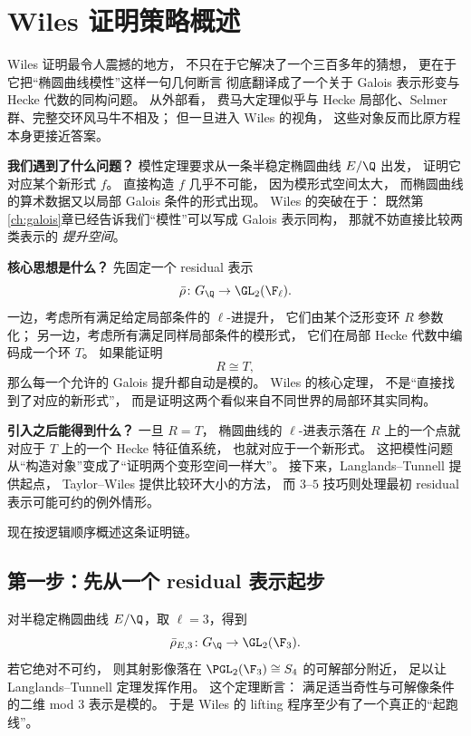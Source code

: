 \section{Wiles 证明策略概述}
\label{sec:ch10-wiles-strategy}

\providecommand{\rhobar}{\bar{\rho}}
\providecommand{\Sel}{\operatorname{Sel}}

Wiles 证明最令人震撼的地方，
不只在于它解决了一个三百多年的猜想，
更在于它把“椭圆曲线模性”这样一句几何断言
彻底翻译成了一个关于 Galois 表示形变与 Hecke 代数的同构问题。
从外部看，
费马大定理似乎与 Hecke 局部化、Selmer 群、完整交环风马牛不相及；
但一旦进入 Wiles 的视角，
这些对象反而比原方程本身更接近答案。

\textbf{我们遇到了什么问题？}
模性定理要求从一条半稳定椭圆曲线 $E/\Q$ 出发，
证明它对应某个新形式 $f$。
直接构造 $f$ 几乎不可能，
因为模形式空间太大，
而椭圆曲线的算术数据又以局部 Galois 条件的形式出现。
Wiles 的突破在于：
既然第\ref{ch:galois}章已经告诉我们“模性”可以写成 Galois 表示同构，
那就不妨直接比较两类表示的 \emph{提升空间}。

\textbf{核心思想是什么？}
先固定一个 residual 表示
\[
  \rhobar\colon G_\Q\to \GL_2(\F_\ell).
\]
一边，考虑所有满足给定局部条件的 $\ell$-进提升，
它们由某个泛形变环 $R$ 参数化；
另一边，考虑所有满足同样局部条件的模形式，
它们在局部 Hecke 代数中编码成一个环 $T$。
如果能证明
\[
  R\cong T,
\]
那么每一个允许的 Galois 提升都自动是模的。
Wiles 的核心定理，
不是“直接找到了对应的新形式”，
而是证明这两个看似来自不同世界的局部环其实同构。

\textbf{引入之后能得到什么？}
一旦 $R=T$，
椭圆曲线的 $\ell$-进表示落在 $R$ 上的一个点就对应于 $T$ 上的一个 Hecke 特征值系统，
也就对应于一个新形式。
这把模性问题从“构造对象”变成了“证明两个变形空间一样大”。
接下来，Langlands--Tunnell 提供起点，
Taylor--Wiles 提供比较环大小的方法，
而 $3$--$5$ 技巧则处理最初 residual 表示可能可约的例外情形。



现在按逻辑顺序概述这条证明链。

\subsection*{第一步：先从一个 residual 表示起步}
对半稳定椭圆曲线 $E/\Q$，取 $\ell=3$，得到
\[
  \rhobar_{E,3}\colon G_\Q\to \GL_2(\F_3).
\]
若它绝对不可约，
则其射影像落在 $\PGL_2(\F_3)\cong S_4$ 的可解部分附近，
足以让 Langlands--Tunnell 定理发挥作用。
这个定理断言：
满足适当奇性与可解像条件的二维 mod $3$ 表示是模的。
于是 Wiles 的 lifting 程序至少有了一个真正的“起跑线”。


